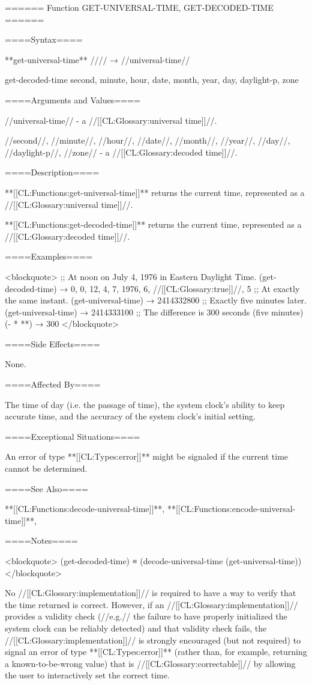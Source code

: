 ====== Function GET-UNIVERSAL-TIME, GET-DECODED-TIME ======

====Syntax====

**get-universal-time** //\noargs// → //universal-time//

\DefunWithValuesNewline get-decoded-time {\noargs} {second, minute, hour, date, month, year, day, daylight-p, zone}

====Arguments and Values====

//universal-time// - a //[[CL:Glossary:universal time]]//.

//second//, //minute//, //hour//, //date//, //month//, //year//, //day//, //daylight-p//, //zone// - a //[[CL:Glossary:decoded time]]//.

====Description====

**[[CL:Functions:get-universal-time]]** returns the current time, represented as a //[[CL:Glossary:universal time]]//.

**[[CL:Functions:get-decoded-time]]** returns the current time, represented as a //[[CL:Glossary:decoded time]]//.

====Examples====

<blockquote> ;; At noon on July 4, 1976 in Eastern Daylight Time. (get-decoded-time) → 0, 0, 12, 4, 7, 1976, 6, //[[CL:Glossary:true]]//, 5 ;; At exactly the same instant. (get-universal-time) → 2414332800 ;; Exactly five minutes later. (get-universal-time) → 2414333100 ;; The difference is 300 seconds (five minutes) (- * **) → 300 </blockquote>

====Side Effects====

None.

====Affected By====

The time of day (i.e. the passage of time), the system clock's ability to keep accurate time, and the accuracy of the system clock's initial setting.

====Exceptional Situations====

An error of type **[[CL:Types:error]]** might be signaled if the current time cannot be determined.

====See Also====

**[[CL:Functions:decode-universal-time]]**, **[[CL:Functions:encode-universal-time]]**, {\secref\Time}

====Notes====

<blockquote> (get-decoded-time) ≡ (decode-universal-time (get-universal-time)) </blockquote>

No //[[CL:Glossary:implementation]]// is required to have a way to verify that the time returned is correct. However, if an //[[CL:Glossary:implementation]]// provides a validity check (//e.g.// the failure to have properly initialized the system clock can be reliably detected) and that validity check fails, the //[[CL:Glossary:implementation]]// is strongly encouraged (but not required) to signal an error of type **[[CL:Types:error]]** (rather than, for example, returning a known-to-be-wrong value) that is //[[CL:Glossary:correctable]]// by allowing the user to interactively set the correct time.

